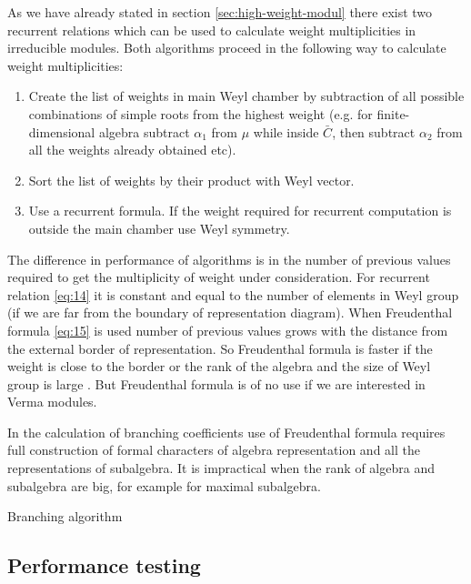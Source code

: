 \documentclass[preprint,12pt]{elsarticle}
\begin{document}
As we have already stated in section \ref{sec:high-weight-modul} there exist two recurrent relations which can be used to calculate weight multiplicities in irreducible modules. Both algorithms proceed in the following way to calculate weight multiplicities:
\begin{enumerate}
\item Create the list of weights in main Weyl chamber by subtraction of all possible combinations of simple roots from the highest weight (e.g. for finite-dimensional algebra subtract $\alpha_{1}$ from $\mu$ while inside $\bar C$, then subtract $\alpha_{2}$ from all the weights already obtained etc).
\item Sort the list of weights by their product with Weyl vector.
\item Use a recurrent formula. If the weight required for recurrent computation is outside the main chamber use Weyl symmetry. 
\end{enumerate}
The difference in performance of algorithms is in the number of previous values required to get the multiplicity of weight under consideration. For recurrent relation \eqref{eq:14} it is constant and equal to the number of elements in Weyl group (if we are far from the boundary of representation diagram). When Freudenthal formula \eqref{eq:15} is used number of previous values grows with the distance from the external border of representation. So Freudenthal formula is faster if the weight is close to the border or the rank of the algebra and the size of Weyl group is large \cite{moody1982fast}. 
But Freudenthal formula is of no use if we are interested in Verma modules. 

In the calculation of branching coefficients use of Freudenthal formula requires full construction of formal characters of algebra representation and all the representations of subalgebra. It is impractical when the rank of algebra and subalgebra are big, for example for maximal subalgebra.

Branching algorithm \cite{2010arXiv1007.0318L}
\subsection{Performance testing}
\label{sec:performance-testing}
\end{document}
